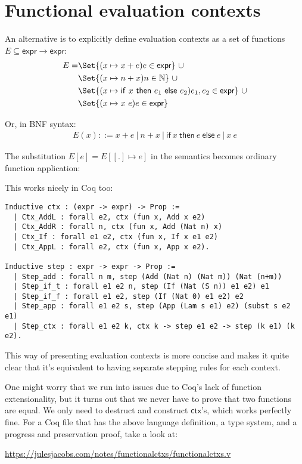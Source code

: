 \documentclass[a4paper, 11pt]{article}
\providecommand\given{} %
\newcommand{\mif}{\mathsf{if}\ }
\newcommand{\mthen}{\ \mathsf{then}\ }
\newcommand{\melse}{\ \mathsf{else}\ }
\begin{document}
\section{Functional evaluation contexts}

An alternative is to explicitly define evaluation contexts as a set of functions $E \subseteq \mathsf{expr} \to \mathsf{expr}$:
\begin{align*}
  E = &\Set{(x \mapsto x + e) \given e \in \mathsf{expr} }\ \cup \\
  &\Set{(x \mapsto n + x) \given n \in \mathbb{N} }\ \cup \\
  &\Set{(x \mapsto \mif x \mthen e_1 \melse e_2) \given e_1,e_2 \in \mathsf{expr} }\ \cup \\
  &\Set{(x \mapsto x\ e) \given e \in \mathsf{expr} }
\end{align*}

Or, in BNF syntax:
\begin{align*}
  E(x) ::= x + e\ |\ n + x\ |\ \mif x \mthen e \melse e\ |\ x\ e
\end{align*}

The substitution $E[e] = E[[.] \mapsto e]$ in the semantics becomes ordinary function application:
\begin{mathpar}
\end{mathpar}

This works nicely in Coq too:
\begin{lstlisting}
Inductive ctx : (expr -> expr) -> Prop :=
  | Ctx_AddL : forall e2, ctx (fun x, Add x e2)
  | Ctx_AddR : forall n, ctx (fun x, Add (Nat n) x)
  | Ctx_If : forall e1 e2, ctx (fun x, If x e1 e2)
  | Ctx_AppL : forall e2, ctx (fun x, App x e2).

Inductive step : expr -> expr -> Prop :=
  | Step_add : forall n m, step (Add (Nat n) (Nat m)) (Nat (n+m))
  | Step_if_t : forall e1 e2 n, step (If (Nat (S n)) e1 e2) e1
  | Step_if_f : forall e1 e2, step (If (Nat 0) e1 e2) e2
  | Step_app : forall e1 e2 s, step (App (Lam s e1) e2) (subst s e2 e1)
  | Step_ctx : forall e1 e2 k, ctx k -> step e1 e2 -> step (k e1) (k e2).
\end{lstlisting}

This way of presenting evaluation contexts is more concise and makes it quite clear that it's equivalent to having separate stepping rules for each context.

One might worry that we run into issues due to Coq's lack of function extensionality, but it turns out that we never have to prove that two functions are equal. We only need to destruct and construct $\mathsf{ctx}$'s, which works perfectly fine. For a Coq file that has the above language definition, a type system, and a progress and preservation proof, take a look at:

\begin{center}
  \url{https://julesjacobs.com/notes/functionalctxs/functionalctxs.v}
\end{center}
\end{document}
